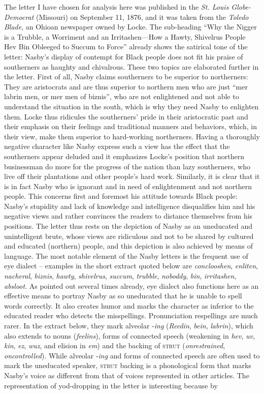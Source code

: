 The letter I have chosen for analysis here was published in the \emph{St. Louis Globe-Democrat} (Missouri) on September 11, 1876, and it was taken from the \emph{Toledo Blade}, an Ohioan newspaper owned by Locke. The sub-heading “Why the Nigger is a Trubble, a Worriment and an Irritashen—How a Hawty, Shivelrus People Hev Bin Obleeged to Succum to Force” already shows the satirical tone of the letter: Nasby’s display of contempt for Black people does not fit his praise of southerners as haughty and chivalrous. These two topics are elaborated further in the letter. First of all, Nasby claims southerners to be superior to northerners: They are aristocrats and are thus superior to northern men who are just “mer labrin men, or mer men of biznis”, who are not enlightened and not able to understand the situation in the south, which is why they need Nasby to enlighten them. Locke thus ridicules the southerners’ pride in their aristocratic past and their emphasis on their feelings and traditional manners and behaviors, which, in their view, make them superior to hard-working northerners. Having a thoroughly negative character like Nasby express such a view has the effect that the southerners appear deluded and it emphasizes Locke’s position that northern businessman do more for the progress of the nation than lazy southerners, who live off their plantations and other people’s hard work. Similarly, it is clear that it is in fact Nasby who is ignorant and in need of enlightenment and not northern people. This concerns first and foremost his attitude towards Black people: Nasby’s stupidity and lack of knowledge and intelligence disqualifies him and his negative views and rather convinces the readers to distance themselves from his positions. The letter thus rests on the depiction of Nasby as an uneducated and unintelligent brute, whose views are ridiculous and not to be shared by cultured and educated (northern) people, and this depiction is also achieved by means of language. The most notable element of the Nasby letters is the frequent use of eye dialect – examples in the short extract quoted below are \emph{conclooshen}, \emph{enliten}, \emph{nacheral}, \emph{biznis}, \emph{hawty}, \emph{shivelrus}, \emph{succum}, \emph{trubble}, \emph{noboddy}, \emph{bin}, \emph{irritashen}, \emph{absloot}. As pointed out several times already, eye dialect also functions here as an effective means to portray Nasby as so uneducated that he is unable to spell words correctly. It also creates humor and marks the character as inferior to the educated reader who detects the misspellings. Pronunciation respellings are much rarer. In the extract below, they mark alveolar -\emph{ing} (\emph{Reedin}, \emph{bein}, \emph{labrin}), which also extends to nouns (\emph{feelins}), forms of connected speech (weakening in \emph{hev}, \emph{uv}, \emph{kin}, \emph{ez}, \emph{wuz}, and elision in \emph{em}) and the backing of \textsc{strut} (\emph{onrestrained}, \emph{oncontrolled}). While alveolar -\emph{ing} and forms of connected speech are often used to mark the uneducated speaker, \textsc{strut} backing is a phonological form that marks Nasby’s voice as different from that of voices represented in other articles. The representation of yod-dropping in the letter is interesting because by 